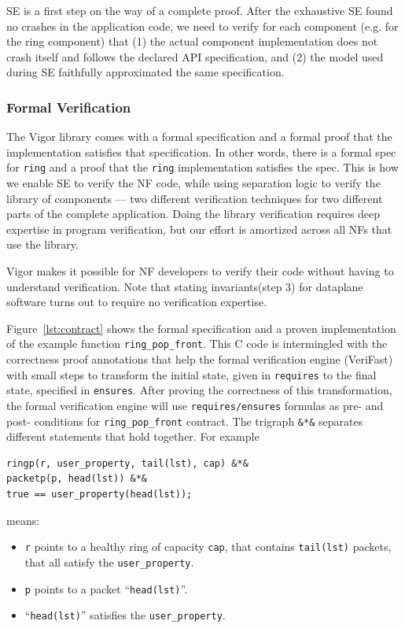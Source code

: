 \documentclass[letterpaper,twocolumn,10pt]{article}
\newcommand{\code}[1]{\lstinline{#1}}
\begin{document}
SE is a first step on the way of a complete proof. After the exhaustive SE found
no crashes in the application code, we need to verify for each component (e.g.
for the ring component) that (1) the actual component implementation does not
crash itself and follows the declared API specification, and (2) the model used
during SE faithfully approximated the same specification.

\subsubsection{Formal Verification}

The Vigor library comes with a formal specification and a formal proof that the
implementation satisfies that specification. In other words, there is a formal
spec for \code{ring} and a proof that the \code{ring} implementation satisfies
the spec. This is how we enable SE to verify the NF code, while using
separation logic to verify the library of components --- two different
verification techniques for two different parts of the complete application.
Doing the library verification requires deep expertise in program verification,
but our effort is amortized across all NFs that use the library.

Vigor makes it possible for NF developers to verify their code without having to
understand verification. Note that stating invariants(step 3) for dataplane
software turns out to require no verification expertise.

Figure~\ref{lst:contract} shows the formal specification and a proven
implementation of the example function \code{ring_pop_front}. This C code is
intermingled with the correctness proof annotations that help the formal
verification engine (VeriFast) with small steps to transform the initial state,
given in \code{requires} to the final state, specified in \code{ensures}. After
proving the correctness of this transformation, the formal verification engine
will use \code{requires/ensures} formulas as pre- and post- conditions for
\code{ring_pop_front} contract. The trigraph \code{&*&} separates different
statements that hold together. For example

\begin{lstlisting}
ringp(r, user_property, tail(lst), cap) &*&
packetp(p, head(lst)) &*&
true == user_property(head(lst));
\end{lstlisting}
means:
\begin{itemize}
\item \code{r} points to a healthy ring of capacity \code{cap}, that contains
  \code{tail(lst)} packets, that all satisfy the \code{user_property}.
\item \code{p} points to a packet ``\code{head(lst)}''.
\item ``\code{head(lst)}'' satisfies the \code{user_property}.
\end{itemize}
\end{document}
